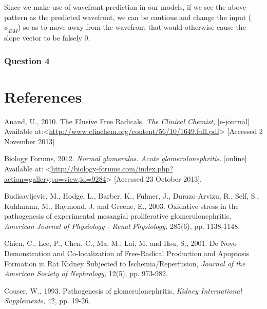 \documentclass[12pt]{report}
\begin{document}
Since we make use of wavefront prediction in our models, if we see the above pattern as the predicted wavefront, we can be cautious and change the input ($\phi_{DM}$) so as to move away from the wavefront that would otherwise cause the slope vector to be falsely 0.

\subsubsection*{Question 4}

\newpage
\section*{References}

Anand, U., 2010. The Elusive Free Radicals, \textit{The Clinical Chemist,} [e-journal] Available at:<\url{http://www.clinchem.org/content/56/10/1649.full.pdf}> [Accessed 2 November 2013]
\newline
\newline

Biology Forums, 2012. \textit{Normal glomerulus. Acute glomerulonephritis.} [online] Available at: <\url{http://biology-forums.com/index.php?action=gallery;sa=view;id=9284}> [Accessed 23 October 2013].
\newline
\newline

Budisavljevic, M., Hodge, L., Barber, K., Fulmer, J., Durazo-Arvizu, R., Self, S., Kuhlmann, M., Raymond, J. and Greene, E., 2003. Oxidative stress in the pathogenesis of experimental mesangial proliferative glomerulonephritis, \textit{American Journal of Physiology - Renal Physiology,} 285(6), pp. 1138-1148.
\newline
\newline

Chien, C., Lee, P., Chen, C., Ma, M., Lai, M. and Hsu, S., 2001. De Novo Demonstration and Co-localization of Free-Radical Production and Apoptosis Formation in Rat Kidney Subjected to Ischemia/Reperfusion, \textit{Journal of the American Society of Nephrology,} 12(5), pp. 973-982.
\newline
\newline

Couser, W., 1993. Pathogenesis of glomerulonephritis, \textit{Kidney International Supplements,} 42, pp. 19-26.
\newline
\newline
\end{document}
